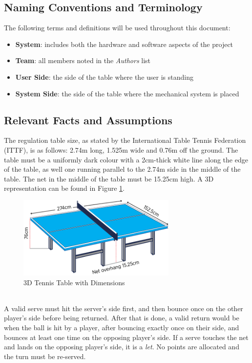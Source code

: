 \documentclass[11pt]{article}
\begin{document}
\subsection{Naming Conventions and Terminology}
The following terms and definitions will be used throughout this document:
\begin{itemize}
\item \textbf{System}: includes both the hardware and software aspects of the project
\item \textbf{Team}: all members noted in the \textit{Authors} list
\item \textbf{User Side}: the side of the table where the user is standing
\item \textbf{System Side}: the side of the table where the mechanical system is placed
\end{itemize}
\subsection{Relevant Facts and Assumptions}
The regulation table size, as stated by the International Table Tennis Federation (ITTF), is as follows: 2.74m long, 1.525m wide and 0.76m off the ground. The table must be a uniformly dark colour with a 2cm-thick white line along the edge of the table, as well one running parallel to the 2.74m side in the middle of the table. The net in the middle of the table must be 15.25cm high. A 3D representation can be found in Figure \ref{fig:table-tennis-dim}.
\begin{figure}[htbp]
   \centering
   \includegraphics[width=0.7\textwidth]{../img/table-tennis-dim.png} %
   \caption{3D Tennis Table with Dimensions}
   \label{fig:table-tennis-dim}
\end{figure} \\
A valid serve must hit the server's side first, and then bounce once on the other player's side before being returned. After that is done, a valid return would be when the ball is hit by a player, after bouncing exactly once on their side, and bounces at least one time on the opposing player's side. If a serve touches the net and lands on the opposing player's side, it is a \textit{let}. No points are allocated and the turn must be re-served.
\end{document}
